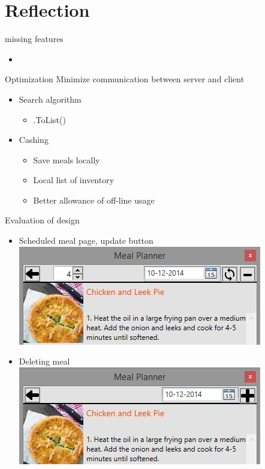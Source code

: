\section{Reflection}

\begin{frame}{missing features}%
	\begin{itemize}
		\item
	\end{itemize}
\end{frame}

\begin{frame}{Optimization}
	Minimize communication between server and client
	\begin{itemize}
		\item Search algorithm
		\begin{itemize}
			\item .ToList()
		\end{itemize}
		\item Cashing
		\begin{itemize}
			\item Save meals locally
			\item Local list of inventory
			\item Better allowance of off-line usage
		\end{itemize}
	\end{itemize}
\end{frame}

\begin{frame}{Evaluation of design}
	\begin{itemize}
		\item Scheduled meal page, update button
		\newline \includegraphics[scale=0.4]{./graphics/datepicker}
		\item Deleting meal
		\newline \includegraphics[scale=0.4]{./graphics/datepickerNotPlanned}
	\end{itemize}
\end{frame}

